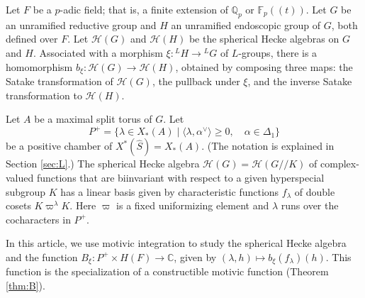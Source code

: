 
% 


\newcommand{\ring}[1]{\mathbb{#1}}
\newcommand{\ang}[1]{\langle{#1}\rangle}
\def\op#1{{\operatorname{#1}}}

\def\Q{{\ring{Q}}}

\def\C{\mathcal C}
\def\N{\mathcal N}
\def\H{\mathcal H}
\def\T{\mathcal T}
\def\D{\mathcal D}

\def\n{{\mathfrak n}}
\def\g{{\mathfrak g}}
\def\t{{\mathfrak t}}
\def\h{{\mathfrak h}}

\def\inv{\op{inv}}
\def\dom{P^+}
\newcommand{\card}{\op{card}}
\def\Frob{\op{Frob}}
\def\dotw{\dot w}
\def\uu{\upsilon} %

\def\libel#1{{\text{\sc [#1]~}}\label{#1}}
\def\rif#1{(\ref{#1}-{\text{\sc #1})}}


Let $F$ be a $p$-adic field; that is, a finite extension of
$\ring{Q}_p$ or $\ring{F}_p((t))$.  Let $G$ be an unramified reductive
group and $H$ an unramified endoscopic group of $G$, both defined over
$F$.  Let $\H(G)$ and $\H(H)$ be the spherical Hecke algebras on $G$
and $H$.  Associated with a morphism $\xi:{}^LH\to {}^LG$ of
$L$-groups, there is a homomorphism $b_\xi:\H(G)\to \H(H)$, obtained
by composing three maps: the Satake transformation of $\H(G)$, the
pullback under $\xi$, and the inverse Satake transformation to
$\H(H)$.

Let $A$ be a maximal split torus of $G$.  Let 
\[
\dom = \{\lambda\in X_*(A) \mid \ang{\lambda,\alpha^\vee}\ge 0,
\quad \alpha\in \Delta_1\}
\]
be a positive chamber of $X^*(\hat S) = X_*(A)$.  (The notation is
explained in Section \ref{sec:L}.)  The spherical Hecke algebra
$\H(G)=\H(G//K)$ of complex-valued functions that are biinvariant with
respect to a given hyperspecial subgroup $K$ has a linear basis given
by characteristic functions $f_\lambda$ of double cosets
$K\varpi^\lambda K$.  Here $\varpi$ is a fixed uniformizing element
and $\lambda$ runs over the cocharacters in $P^+$.

In this article, we use motivic integration to study the spherical
Hecke algebra and the function $B_\xi:P^+\times H(F)\to \ring{C}$,
given by $(\lambda,h)\mapsto b_\xi(f_\lambda)(h)$.  This function is
the specialization of a constructible motivic function (Theorem
\ref{thm:B}).

